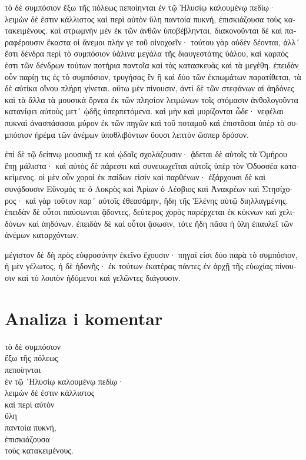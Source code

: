 {\large

\begin{greek}

\noindent τὸ δὲ συμπόσιον ἔξω τῆς πόλεως πεποίηνται ἐν τῷ Ἠλυσίῳ καλουμένῳ πεδίῳ· λειμὼν δέ ἐστιν κάλλιστος καὶ περὶ αὐτὸν ὕλη παντοία πυκνή, ἐπισκιάζουσα τοὺς κατακειμένους. καὶ στρωμνὴν μὲν ἐκ τῶν ἀνθῶν ὑποβέβληνται, διακονοῦνται δὲ καὶ παραφέρουσιν ἕκαστα οἱ ἄνεμοι πλήν γε τοῦ οἰνοχοεῖν· τούτου γὰρ οὐδὲν δέονται, ἀλλ´ ἔστι δένδρα περὶ τὸ συμπόσιον ὑάλινα μεγάλα τῆς διαυγεστάτης ὑάλου, καὶ καρπός ἐστι τῶν δένδρων τούτων ποτήρια παντοῖα καὶ τὰς κατασκευὰς καὶ τὰ μεγέθη. ἐπειδὰν οὖν παρίῃ τις ἐς τὸ συμπόσιον, τρυγήσας ἓν ἢ καὶ δύο τῶν ἐκπωμάτων παρατίθεται, τὰ δὲ αὐτίκα οἴνου πλήρη γίνεται. οὕτω μὲν πίνουσιν, ἀντὶ δὲ τῶν στεφάνων αἱ ἀηδόνες καὶ τὰ ἄλλα τὰ μουσικὰ ὄρνεα ἐκ τῶν πλησίον λειμώνων τοῖς στόμασιν ἀνθολογοῦντα κατανίφει αὐτοὺς μετ´ ᾠδῆς ὑπερπετόμενα. καὶ μὴν καὶ μυρίζονται ὧδε· νεφέλαι πυκναὶ ἀνασπάσασαι μύρον ἐκ τῶν πηγῶν καὶ τοῦ ποταμοῦ καὶ ἐπιστᾶσαι ὑπὲρ τὸ συμπόσιον ἠρέμα τῶν ἀνέμων ὑποθλιβόντων ὕουσι λεπτὸν ὥσπερ δρόσον.

\noindent ἐπὶ δὲ τῷ δείπνῳ μουσικῇ τε καὶ ᾠδαῖς σχολάζουσιν· ᾄδεται δὲ αὐτοῖς τὰ Ὁμήρου ἔπῃ μάλιστα· καὶ αὐτὸς δὲ πάρεστι καὶ συνευωχεῖται αὐτοῖς ὑπὲρ τὸν Ὀδυσσέα κατακείμενος. οἱ μὲν οὖν χοροὶ ἐκ παίδων εἰσὶν καὶ παρθένων· ἐξάρχουσι δὲ καὶ συνᾴδουσιν Εὔνομός τε ὁ Λοκρὸς καὶ Ἀρίων ὁ Λέσβιος καὶ Ἀνακρέων καὶ Στησίχορος· καὶ γὰρ τοῦτον παρ´ αὐτοῖς ἐθεασάμην, ἤδη τῆς Ἑλένης αὐτῷ διηλλαγμένης. ἐπειδὰν δὲ οὗτοι παύσωνται ᾄδοντες, δεύτερος χορὸς παρέρχεται ἐκ κύκνων καὶ χελιδόνων καὶ ἀηδόνων. ἐπειδὰν δὲ καὶ οὗτοι ᾄσωσιν, τότε ἤδη πᾶσα ἡ ὕλη ἐπαυλεῖ τῶν ἀνέμων καταρχόντων.

\noindent μέγιστον δὲ δὴ πρὸς εὐφροσύνην ἐκεῖνο ἔχουσιν· πηγαί εἰσι δύο παρὰ τὸ συμπόσιον, ἡ μὲν γέλωτος, ἡ δὲ ἡδονῆς· ἐκ τούτων ἑκατέρας πάντες ἐν ἀρχῇ τῆς εὐωχίας πίνουσιν καὶ τὸ λοιπὸν ἡδόμενοι καὶ γελῶντες διάγουσιν.

\end{greek}

}

\newpage

\section*{Analiza i komentar}


{\large
\begin{greek}
\noindent τὸ δὲ συμπόσιον \\
 \tabto{2em} ἔξω τῆς πόλεως \\
πεποίηνται \\
\tabto{2em} ἐν τῷ ᾿Ηλυσίῳ καλουμένῳ πεδίῳ· \\
\tabto{4em} λειμὼν δέ ἐστιν κάλλιστος \\
\tabto{4em} καὶ περὶ αὐτὸν \\
\tabto{4em} ὕλη \\
\tabto{6em} παντοία πυκνή, \\
\tabto{6em} ἐπισκιάζουσα \\
\tabto{8em} τοὺς κατακειμένους. \\

\end{greek}
}

